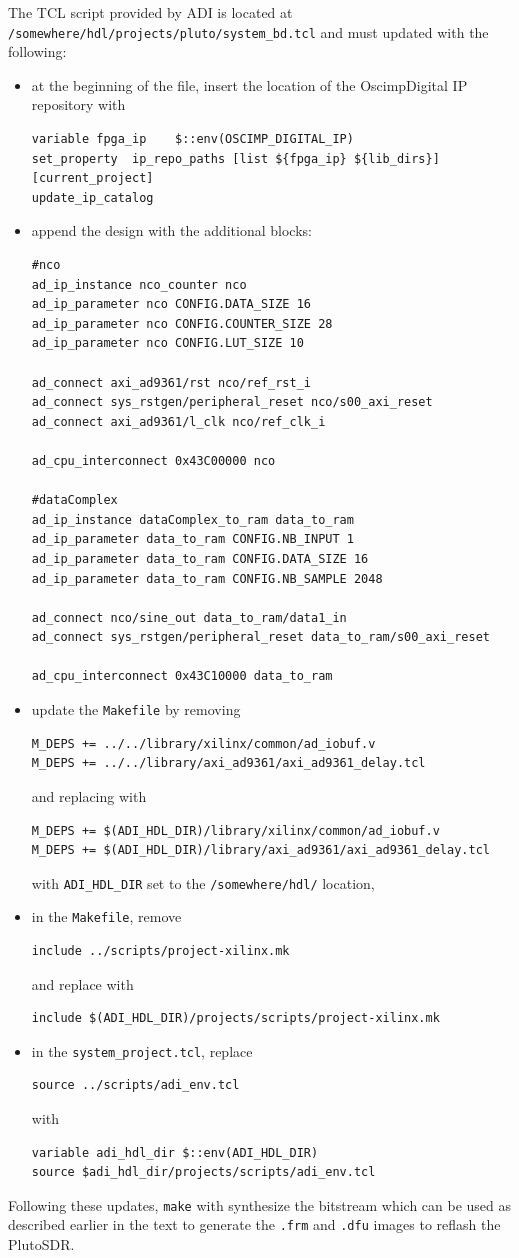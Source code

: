 \documentclass{article}
\begin{document}
The TCL script provided by ADI is located at {\tt /somewhere/hdl/projects/pluto/system\_bd.tcl} and
must updated with the following:
\begin{itemize}
\item at the beginning of the file, insert the location of the OscimpDigital IP repository with
{\footnotesize
\begin{verbatim}
variable fpga_ip    $::env(OSCIMP_DIGITAL_IP)
set_property  ip_repo_paths [list ${fpga_ip} ${lib_dirs}] [current_project]
update_ip_catalog
\end{verbatim}
}
\item append the design with the additional blocks:
{\footnotesize
\begin{verbatim}
#nco
ad_ip_instance nco_counter nco
ad_ip_parameter nco CONFIG.DATA_SIZE 16
ad_ip_parameter nco CONFIG.COUNTER_SIZE 28
ad_ip_parameter nco CONFIG.LUT_SIZE 10

ad_connect axi_ad9361/rst nco/ref_rst_i
ad_connect sys_rstgen/peripheral_reset nco/s00_axi_reset
ad_connect axi_ad9361/l_clk nco/ref_clk_i

ad_cpu_interconnect 0x43C00000 nco

#dataComplex
ad_ip_instance dataComplex_to_ram data_to_ram
ad_ip_parameter data_to_ram CONFIG.NB_INPUT 1
ad_ip_parameter data_to_ram CONFIG.DATA_SIZE 16
ad_ip_parameter data_to_ram CONFIG.NB_SAMPLE 2048

ad_connect nco/sine_out data_to_ram/data1_in
ad_connect sys_rstgen/peripheral_reset data_to_ram/s00_axi_reset

ad_cpu_interconnect 0x43C10000 data_to_ram
\end{verbatim}
}
\item update the {\tt Makefile} by removing
{\footnotesize
\begin{verbatim}
M_DEPS += ../../library/xilinx/common/ad_iobuf.v
M_DEPS += ../../library/axi_ad9361/axi_ad9361_delay.tcl
\end{verbatim}
}
and replacing with
{\footnotesize
\begin{verbatim}
M_DEPS += $(ADI_HDL_DIR)/library/xilinx/common/ad_iobuf.v
M_DEPS += $(ADI_HDL_DIR)/library/axi_ad9361/axi_ad9361_delay.tcl
\end{verbatim}
}
with {\tt ADI\_HDL\_DIR} set to the {\tt /somewhere/hdl/} location,
\item 
in the {\tt Makefile}, remove
{\footnotesize
\begin{verbatim}
include ../scripts/project-xilinx.mk
\end{verbatim}
}
and replace with
{\footnotesize
\begin{verbatim}
include $(ADI_HDL_DIR)/projects/scripts/project-xilinx.mk
\end{verbatim}
}
\item in the {\tt system\_project.tcl}, replace
{\footnotesize
\begin{verbatim}
source ../scripts/adi_env.tcl
\end{verbatim}
}
with
{\footnotesize
\begin{verbatim}
variable adi_hdl_dir $::env(ADI_HDL_DIR)
source $adi_hdl_dir/projects/scripts/adi_env.tcl
\end{verbatim}
}
\end{itemize}

Following these updates, {\tt make} with synthesize the bitstream which can be
used as described earlier in the text to generate the {\tt .frm} and {\tt .dfu}
images to reflash the PlutoSDR.
\end{document}
